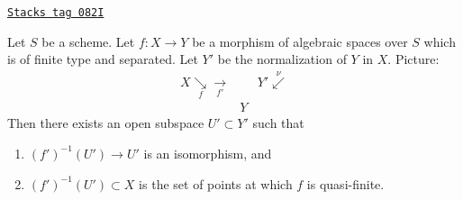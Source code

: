\begin{lemma}
\label{spaces-more-morphisms-lemma-finite-type-separated}
\href{https://stacks.math.columbia.edu/tag/082I}{\texttt{Stacks tag 082I}}

Let $S$ be a scheme. Let $f : X \to Y$ be a morphism of algebraic
spaces over $S$ which is of finite type and separated.
Let $Y'$ be the normalization of $Y$ in $X$. Picture:
$$
\begin{array}{ccc}X \underset{f}{\searrow}\underset{f'}{\longrightarrow} &  & Y' \overset{\nu}{\swarrow} \\  & Y & \end{array}
$$
Then there exists an open subspace $U' \subset Y'$ such that
\begin{enumerate}
\item $(f')^{-1}(U') \to U'$ is an isomorphism, and
\item $(f')^{-1}(U') \subset X$ is the set of points at which
$f$ is quasi-finite.
\end{enumerate}
\end{lemma}

